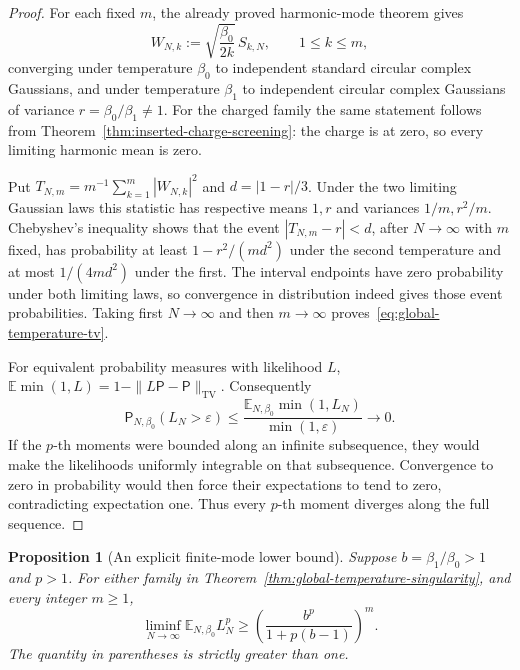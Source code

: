 \documentclass[11pt,a4paper]{article}
\numberwithin{equation}{section}
\newtheorem{proposition}[theorem]{Proposition}
\theoremstyle{definition}
\theoremstyle{remark}
\newcommand{\E}{\mathbb E}
\begin{document}
\begin{proof}
For each fixed $m$, the already proved harmonic-mode theorem gives
\[
 W_{N,k}:=\sqrt{\frac{\beta_0}{2k}}\,S_{k,N},\qquad 1\le k\le m,
\]
converging under temperature $\beta_0$ to independent standard
circular complex Gaussians, and under temperature $\beta_1$ to
independent circular complex Gaussians of variance
$r=\beta_0/\beta_1\ne1$.  For the charged family the same statement
follows from Theorem~\ref{thm:inserted-charge-screening}: the charge
is at zero, so every limiting harmonic mean is zero.

Put $T_{N,m}=m^{-1}\sum_{k=1}^m|W_{N,k}|^2$ and
$d=|1-r|/3$.  Under the two limiting Gaussian laws this statistic
has respective means $1,r$ and variances $1/m,r^2/m$.
Chebyshev's inequality shows that the event
$|T_{N,m}-r|<d$, after $N\to\infty$ with $m$ fixed, has probability
at least $1-r^2/(md^2)$ under the second temperature and at most
$1/(4md^2)$ under the first.  The interval endpoints have zero
probability under both limiting laws, so convergence in distribution
indeed gives those event probabilities.  Taking first $N\to\infty$
and then $m\to\infty$ proves~\eqref{eq:global-temperature-tv}.

For equivalent probability measures with likelihood $L$,
$\E\min(1,L)=1-\|L\mathsf P-\mathsf P\|_{\mathrm{TV}}$.
Consequently
\[
 \mathsf P_{N,\beta_0}(L_N>\varepsilon)
 \le\frac{\E_{N,\beta_0}\min(1,L_N)}{\min(1,\varepsilon)}
 \longrightarrow0.
\]
If the $p$-th moments were bounded along an infinite subsequence,
they would make the likelihoods uniformly integrable on that
subsequence.  Convergence to zero in probability would then force
their expectations to tend to zero, contradicting expectation one.
Thus every $p$-th moment diverges along the full sequence.
\end{proof}

\begin{proposition}[An explicit finite-mode lower bound]
\label{prop:global-temperature-renyi}
Suppose $b=\beta_1/\beta_0>1$ and $p>1$.  For either family in
Theorem~\ref{thm:global-temperature-singularity}, and every integer
$m\ge1$,
\begin{equation}
 \liminf_{N\to\infty}\E_{N,\beta_0}L_N^p
 \ge\left(\frac{b^p}{1+p(b-1)}\right)^m.
 \label{eq:global-temperature-renyi}
\end{equation}
The quantity in parentheses is strictly greater than one.
\end{proposition}
\end{document}
